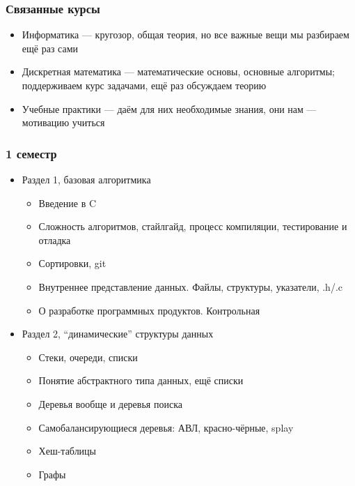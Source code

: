 \documentclass[xetex,mathserif,serif]{beamer}
\begin{document}
    \begin{frame}
        \frametitle{Связанные курсы}
        \begin{itemize}
            \item Информатика --- кругозор, общая теория, но все важные вещи мы разбираем ещё раз сами
            \item Дискретная математика --- математические основы, основные алгоритмы; поддерживаем курс задачами, ещё раз обсуждаем теорию
            \item Учебные практики --- даём для них необходимые знания, они нам --- мотивацию учиться
        \end{itemize}
    \end{frame}

    \begin{frame}
        \frametitle{1 семестр}
        \begin{scriptsize}
            \begin{itemize}
                \item Раздел 1, базовая алгоритмика
                \begin{itemize}
                    \item \scriptsize{Введение в C}
                    \item Сложность алгоритмов, стайлгайд, процесс компиляции, тестирование и отладка
                    \item Сортировки, git
                    \item Внутреннее представление данных. Файлы, структуры, указатели, .h/.c
                    \item О разработке программных продуктов. Контрольная
                \end{itemize}
                \item Раздел 2, ``динамические'' структуры данных
                \begin{scriptsize}
                    \begin{itemize}
                        \item \scriptsize{Стеки, очереди, списки}
                        \item Понятие абстрактного типа данных, ещё списки
                        \item Деревья вообще и деревья поиска
                        \item Самобалансирующиеся деревья: АВЛ, красно-чёрные, splay
                        \item Хеш-таблицы
                        \item Графы

\end{itemize}
\end{scriptsize}
\end{itemize}
\end{scriptsize}
\end{frame}
\end{document}
